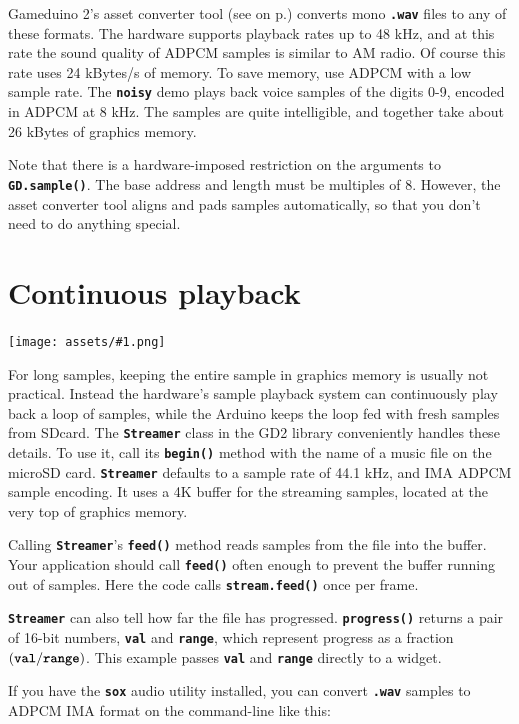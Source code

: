 \documentclass[10pt]{book}
\makeatletter
\newcommand{\gdtwos}{Gameduino 2's }
\newcommand{\png}[1]{
\begin{center}
\texttt{[image: assets/\#1.png]}
\end{center}
}
\newcommand{\mach}[1]{\texttt{\textbf{#1}}}
\newcommand{\cmdidx}[1]{
\index{#1@\mach{#1()}}
}
\newcommand{\cmd}[1]{\cmdidx{cmd\_#1}\nameref{cmd:#1}}
\newcommand{\xref}[1]{\textit{\nameref{#1}} on  p.\pageref{#1}}
\makeatother
\begin{document}
\begin{CJK}{UTF8}{gkai}
\gdtwos asset converter tool (see \xref{assets}) converts mono \mach{.wav}
files to any of these formats.
The hardware supports playback rates up to 48 kHz, and at this rate
the sound quality of ADPCM samples is similar to AM radio.
Of course this rate uses 24 kBytes/s of memory.
To save memory, use ADPCM with a low sample rate. The \mach{noisy} demo
plays back voice samples of the digits 0-9, encoded in ADPCM at 8 kHz.
The samples are quite intelligible, and together take about 26 kBytes of
graphics memory.

Note that there is a hardware-imposed restriction on the arguments to \mach{GD.sample()}.
The base address and length must be multiples of 8.
However, the asset converter tool aligns and pads samples automatically,
so that you don't need to do anything special.

\newpage
{}

\newpage
\section{Continuous playback}

\png{song}

For long samples, keeping the entire sample in graphics memory is usually not practical.
Instead the hardware's sample playback system can continuously play back a loop of samples, while the Arduino keeps the loop fed with
fresh samples from SDcard.
The \mach{Streamer} class in the GD2 library conveniently handles these details.
To use it, call its \mach{begin()} method with the name of a music file on the microSD card.
\mach{Streamer} defaults to a sample rate of 44.1 kHz, and IMA ADPCM sample encoding.
It uses a 4K buffer for the streaming samples, located at the very top of graphics memory.

Calling \mach{Streamer}'s \mach{feed()} method reads samples from the file into the buffer.
Your application should call \mach{feed()} often enough to prevent the buffer running out of samples.
Here the code calls \mach{stream.feed()} once per frame.

\mach{Streamer} can also tell how far the file has progressed.
\mach{progress()} returns a pair of 16-bit numbers,
\mach{val} and \mach{range}, which represent progress as a fraction $(\mach{val} / \mach{range})$.
This example passes \mach{val} and \mach{range} directly to a \cmd{slider} widget.

If you have the \mach{sox} audio utility installed, you can convert \mach{.wav} samples to ADPCM IMA format on the command-line like this:


\end{CJK}
\end{document}
